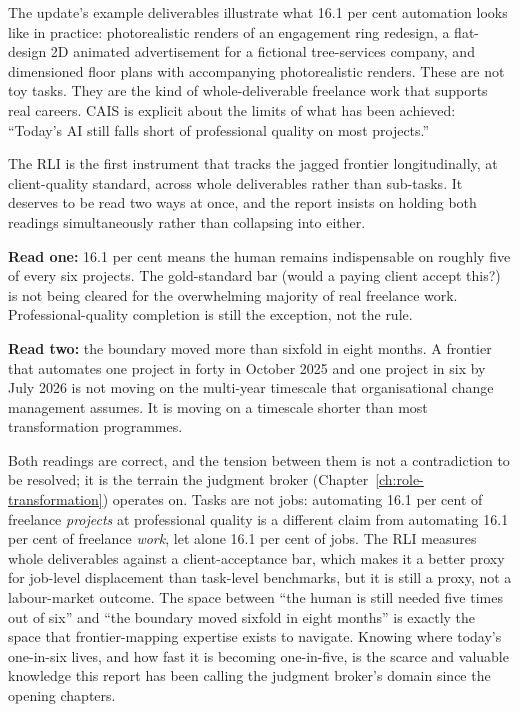 The update's example deliverables illustrate what 16.1 per cent automation looks like in practice: photorealistic renders of an engagement ring redesign, a flat-design 2D animated advertisement for a fictional tree-services company, and dimensioned floor plans with accompanying photorealistic renders. These are not toy tasks. They are the kind of whole-deliverable freelance work that supports real careers. CAIS is explicit about the limits of what has been achieved: ``Today's AI still falls short of professional quality on most projects.''

\begin{keyinsight}[title={The First Longitudinal Quantification of the Jagged Frontier}]
The RLI is the first instrument that tracks the jagged frontier longitudinally, at client-quality standard, across whole deliverables rather than sub-tasks. It deserves to be read two ways at once, and the report insists on holding both readings simultaneously rather than collapsing into either.

\textbf{Read one:} 16.1 per cent means the human remains indispensable on roughly five of every six projects. The gold-standard bar (would a paying client accept this?) is not being cleared for the overwhelming majority of real freelance work. Professional-quality completion is still the exception, not the rule.

\textbf{Read two:} the boundary moved more than sixfold in eight months. A frontier that automates one project in forty in October 2025 and one project in six by July 2026 is not moving on the multi-year timescale that organisational change management assumes. It is moving on a timescale shorter than most transformation programmes.

Both readings are correct, and the tension between them is not a contradiction to be resolved; it is the terrain the judgment broker (Chapter~\ref{ch:role-transformation}) operates on. Tasks are not jobs: automating 16.1 per cent of freelance \emph{projects} at professional quality is a different claim from automating 16.1 per cent of freelance \emph{work}, let alone 16.1 per cent of jobs. The RLI measures whole deliverables against a client-acceptance bar, which makes it a better proxy for job-level displacement than task-level benchmarks, but it is still a proxy, not a labour-market outcome. The space between ``the human is still needed five times out of six'' and ``the boundary moved sixfold in eight months'' is exactly the space that frontier-mapping expertise exists to navigate. Knowing where today's one-in-six lives, and how fast it is becoming one-in-five, is the scarce and valuable knowledge this report has been calling the judgment broker's domain since the opening chapters.
\end{keyinsight}

